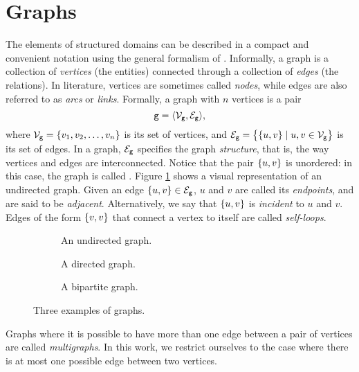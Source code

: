 \section{Graphs}\label{sec:graphs}
The elements of structured domains can be described in a compact and convenient notation using the general formalism of  \citep{bondy1976graph}. Informally, a graph is a collection of \emph{vertices} (the entities) connected through a collection of \emph{edges} (the relations). In literature, vertices are sometimes called \emph{nodes}, while edges are also referred to as \emph{arcs} or \emph{links}. Formally, a graph with $n$ vertices is a pair
$$\Graph{g} =\langle \Nodes_{\Graph{g}}, \Edges_{\Graph{g}}\rangle,$$
where $\Nodes_{\Graph{g}}= \Set{v_1, v_2, \ldots, v_n}$ is its set of vertices, and $\Edges_{\Graph{g}}= \Set{\{u, v\} \mid u, v \in \Nodes_{\Graph{g}}}$ is its set of edges. In a graph, $\Edges_{\Graph{g}}$  specifies the graph \emph{structure}, that is, the way vertices and edges are interconnected. Notice that the pair $\left\{ u,v \right\}$ is unordered: in this case, the graph is called . Figure \ref{fig:undirected-graph} shows a visual representation of an undirected graph.
Given an edge $\Set{u, v} \in \Edges_{\Graph{g}}$, $u$ and $v$ are called its \emph{endpoints}, and are said to be \emph{adjacent}. Alternatively, we say that $\left\{ u, v \right\}$ is \emph{incident} to $u$ and $v$. Edges of the form $\left\{ v,v \right\}$ that connect a vertex to itself are called \emph{self-loops}.
\begin{figure*}
    \begin{subfigure}[b]{0.38\linewidth}
        \centering
        \resizebox{.8\textwidth}{!}{}
        \caption{An undirected graph.}
        \label{fig:undirected-graph}
    \end{subfigure}
    \begin{subfigure}[b]{0.32\linewidth}
        \centering
        \resizebox{.8\textwidth}{!}{}
        \caption{A directed graph.}
        \label{fig:directed-graph}
    \end{subfigure}
    \begin{subfigure}[b]{0.25\linewidth}
        \centering
        \resizebox{.9\textwidth}{!}{}
        \caption{A bipartite graph.}
        \label{fig:bipartite-graph}
    \end{subfigure}
    \caption{Three examples of graphs.}
\end{figure*}
Graphs where it is possible to have more than one edge between a pair of vertices are called \emph{multigraphs}. In this work, we restrict ourselves to the case where there is at most one possible edge between two vertices.

